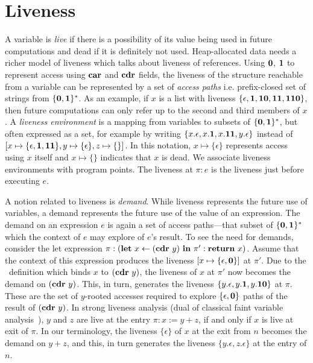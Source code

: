 \documentclass[9pt]{sigplanconf}
\begin{document}
\renewcommand{\pp}[2]{\ensuremath{#1\!\!:\!#2}} %



\section{Liveness}
\label{sec:liveness}

A variable is {\em live} if there  is a possibility of its value being
used in  future computations and  dead if  it is definitely  not used.
Heap-allocated data needs a richer model of liveness which talks about
liveness of  references.  Using  $\mathbf{0}$, $\mathbf{1}$ to  represent access
using  $\mbox{$\mathbf{car}$}$  and  $\mbox{$\mathbf{cdr}$}$  fields,  the  liveness  of  the  structure
reachable from a  variable can be represented by a  set of {\em access
  paths}     i.e.     prefix-closed     set     of    strings     from
$\{\mathbf{0},\mathbf{1}\}^\ast$.  As an example, if $x$ is a list with liveness
$\{\epsilon, \mathbf{1},  \mathbf{1}\mathbf{0}, \mathbf{1}\mathbf{1},  \mathbf{1}\mathbf{1}\mathbf{0}\}$, then
future computations can only refer up  to the second and third members
of $x$.  A  {\em liveness environment} is a mapping  from variables to
subsets of $\{\mathbf{0},\mathbf{1}\}^\ast$,  but often expressed as  a set, for
example by writing $\{x.\epsilon, x.\mathbf{1}, x.\mathbf{1}\mathbf{1}, y.\epsilon\}$
instead       of       $[x       \mapsto\{\epsilon,\mathbf{1},\mathbf{1}\mathbf{1}\},
  y\mapsto\{\epsilon\}, z\mapsto\{\}]$.  In  this notation, $x \mapsto
\{\epsilon\}$ represents access using $x$  itself and $x \mapsto \{\}$
indicates that $x$  is dead.  We associate  liveness environments with
program points.  The  liveness at $\pi:e$ is the  liveness just before
executing $e$.


A  notion  related  to  liveness  is  {\em  demand}.   While  liveness
represents the future use of variables, a demand represents the future
use of the value of an expression.  The demand on an expression $e$ is
again a  set of  access paths---that subset  of $\{\mathbf{0},\mathbf{1}\}^\ast$
which the context of $e$ may explore of $e$'s result.  To see the need
for  demands,  consider   the  let  expression  $\pi:(\mbox{$\mathbf{ let}$}~x\leftarrow
(\mbox{$\mathbf{cdr}$}~y)~\mbox{$\mathbf{ in}$}~  \pi':\mbox{$\mathbf{ return}$}~x)$.  Assume  that  the  context of  this
expression produces  the liveness $[x \mapsto  \lbrace \epsilon, \mathbf{0}
  \rbrace]$ at $\pi'$.  Due to the \LET\ definition which binds $x$ to
$(\mbox{$\mathbf{cdr}$}~y)$, the  liveness of $x$ at  $\pi'$ now becomes the  demand on
$(\mbox{$\mathbf{cdr}$}~y)$.    This,  in   turn,  generates   the  liveness   $\lbrace
y.\epsilon, y.\mathbf{1}, y.\mathbf{1}\mathbf{0} \rbrace$ at $\pi$. These are the set
of $y$-rooted  accesses required  to explore $\lbrace  \epsilon, \mathbf{0}
\rbrace$  paths  of  the  result of  $(\mbox{$\mathbf{cdr}$}~y)$.  In  strong  liveness
analysis       (dual      of       classical      faint       variable
analysis~\cite{horwitz.faint}),  $y$ and  $z$  are live  at the  entry
$\pi: x:=y+z$, if  and only if $x$  is live at exit of  $\pi$.  In our
terminology, the  liveness $\lbrace  \epsilon\rbrace $  of $x$  at the
exit from $n$ becomes the demand on $y+z$, and this, in turn generates
the liveness $\lbrace y.\epsilon, z.\epsilon  \rbrace$ at the entry of
$n$.
\end{document}
